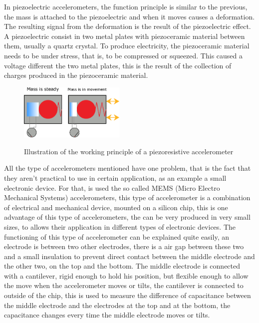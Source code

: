 In piezoelectric accelerometers, the function principle is similar to the previous, the mass is attached to the piezoelectric and when it moves causes a deformation. The resulting signal from the deformation is the result of the piezoelectric effect. A piezoelectric consist in two metal plates with piezoceramic material between them, usually a quartz crystal. To produce electricity, the piezoceramic material needs to be under stress, that is, to be compressed or squeezed. This caused a voltage different the two metal plates, this is the result of the collection of charges produced in the piezoceramic material.
\begin{figure}[]
    \centering
    \includegraphics[width=0.45\textwidth]{Chapters/2CHP/Diagrams/piezoresistiveacc.eps}
    \caption{Illustration of the working principle of a piezoresistive accelerometer}{}    
    \label{fig:wpiezoresistiveacc}
\end{figure}
All the type of accelerometers mentioned have one problem, that is the fact that they aren't practical to use in certain application, as an example a small electronic device. For that, is used the so called MEMS (Micro Electro Mechanical Systems) accelerometers, this type of accelerometer is a combination of electrical and mechanical device, mounted on a silicon chip, this is one advantage of this type of accelerometers, the can be very produced in very small sizes, to allows their application in different types of electronic devices. The functioning of this type of accelerometer can be explained quite easily, an electrode is between two other electrodes, there is a air gap between these two and a small insulation to prevent direct contact between the middle electrode and the other two, on the top and the bottom. The middle electrode is connected with a cantilever, rigid enough to hold his position, but flexible enough to allow the move when the accelerometer moves or tilts, the cantilever is connected to outside of the chip, this is used to measure the difference of capacitance between the middle electrode and the electrodes at the top and at the bottom, the capacitance changes every time the middle electrode moves or tilts.
